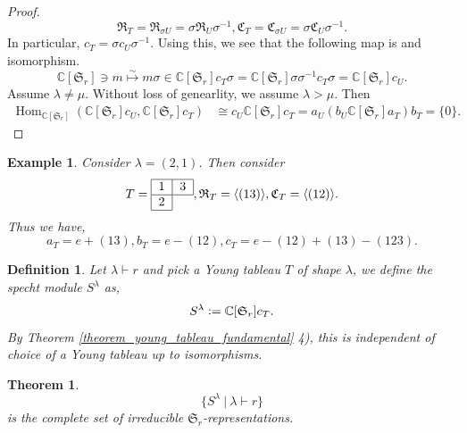 \documentclass{article}
\newtheorem{theorem}{Theorem} [section]
\newtheorem{definition}{Definition}[section]
\newtheorem{example}{Example}[section]
\numberwithin{equation}{theorem}
\DeclareMathOperator{\Hom}{Hom}
\newcommand{\defeq}{\vcentcolon=}
\newcommand{\C}[0]{\mathbb{C}}
\newcommand{\sep}[0]{\:|\:}
\newcommand{\fS}[0]{\mathfrak{S}}
\newcommand{\fR}[0]{\mathfrak{R}}
\newcommand{\fC}[0]{\mathfrak{C}}
\begin{document}
\begin{proof}
    \begin{equation*}
        \fR_T = \fR_{\sigma U} = \sigma\fR_U\sigma^{-1},\fC_T = \fC_{\sigma U} = \sigma\fC_U\sigma^{-1}.
    \end{equation*}
    In particular, $c_T = \sigma c_U\sigma^{-1}$. Using this, we see that the following map is and isomorphism.
    \begin{equation*}
        \C[\fS_r]\ni m\stackrel{\sim}{\mapsto}m\sigma \in \C[\fS_r]c_T\sigma = \C[\fS_r]\sigma\sigma^{-1}c_T\sigma = \C[\fS_r]c_U.
    \end{equation*}
    Assume $\lambda\not=\mu$. Without loss of genearlity, we assume $\lambda>\mu$. Then 
    \begin{align*}
        \Hom_{\C[\fS_r]}(\C[\fS_r]c_U,\C[\fS_r]c_T) & \cong c_U\C[\fS_r]c_T = a_U(b_U\C[\fS_r]a_T)b_T = \{0\}.
    \end{align*}
\end{proof}
\begin{example}
    Consider $\lambda = (2,1)$. Then consider 
    \begin{equation*}
        T=\begin{tabular}{|c|l}
\hline
$1$ & \multicolumn{1}{c|}{$3$} \\ \hline
$2$ &                          \\ \cline{1-1}
\end{tabular},\fR_T = \langle(13)\rangle,\fC_T = \langle(12)\rangle.
    \end{equation*}
    Thus we have,
    \begin{equation*}
        a_T = e+(13),b_T = e-(12),c_T = e-(12)+(13)-(123).
    \end{equation*}
\end{example}
\begin{definition}
    Let $\lambda\vdash r$ and pick a Young tableau $T$ of shape $\lambda$, we define the specht module $S^\lambda$ as,
    \begin{equation*}
        S^\lambda \defeq \C[\fS_r]c_T.
    \end{equation*}
    By Theorem \ref{theorem_young_tableau_fundamental} 4), this is independent of choice of a Young tableau up to isomorphisms.
\end{definition}
\begin{theorem}
    \begin{equation*}
        \{S^\lambda\sep\lambda\vdash r\}
    \end{equation*}
    is the complete set of irreducible $\fS_r$-representations.
\end{theorem}
\end{document}
